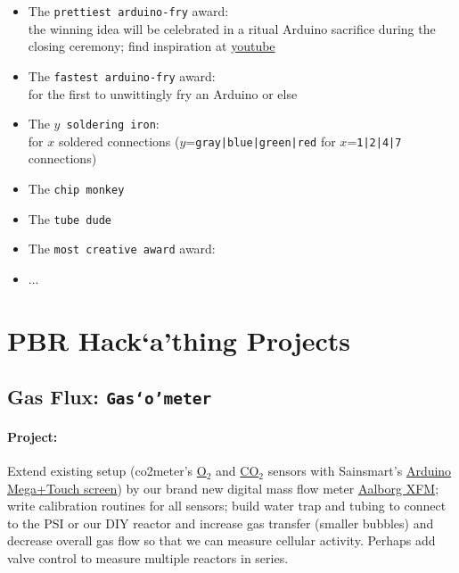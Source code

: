 \documentclass[12pt,a4paper]{scrartcl}
\newcommand{\hack}[0]{Hack`a'thing}
\newcommand{\gasometer}[0]{\texttt{Gas`o'meter}}
\newcommand{\ox}[0]{O$_2$}
\newcommand{\cox}[0]{CO$_2$}
\begin{document}
\begin{itemize}
\item The \texttt{prettiest arduino-fry} award:\\the winning idea will
  be celebrated in a ritual Arduino sacrifice during the closing
  ceremony; find inspiration at
  \href{https://www.youtube.com/watch?v=WmcMrKELkcs}{youtube}
\item The \texttt{fastest arduino-fry} award:\\ for the first to
  unwittingly fry an Arduino or else
\item The \texttt{$y$ soldering iron}:\\ for $x$ soldered
  connections ($y$=\texttt{\small gray|blue|green|red} for
  $x$=\texttt{\small 1|2|4|7} connections)
\item The \texttt{chip monkey} 
\item The \texttt{tube dude} 
\item The \texttt{most creative award} award:
\item ...
\end{itemize}

\newpage
\section{PBR \hack{} Projects}
\label{proj}

\subsection{Gas Flux: \gasometer{}}
\label{gas}
\paragraph{Project:} 
Extend existing setup (co2meter's
\href{http://www.co2meter.com/collections/co2-sensors/oxygen-sensors}{\ox{}}
and
\href{http://www.co2meter.com/collections/co2-sensors/products/cozir-5-100-co2-sensor}{\cox{}}
sensors with Sainsmart's
\href{http://www.sainsmart.com/featured-products/sainsmart-mega2560-board-3-5-tft-lcd-module-display-shield-kit-for-atmel-atmega-avr-16au-atmega8u2.html}{Arduino
  Mega+Touch screen}) by our brand new digital mass flow meter
\href{http://www.aalborg.com/index.php/main_page/product_overview/id_product_overview/63}{Aalborg
  XFM}; write calibration routines for all sensors; build water trap
and tubing to connect to the PSI or our DIY reactor and increase gas
transfer (smaller bubbles) and decrease overall gas flow so that we
can measure cellular activity. Perhaps add valve control to measure
multiple reactors in series.
\end{document}
